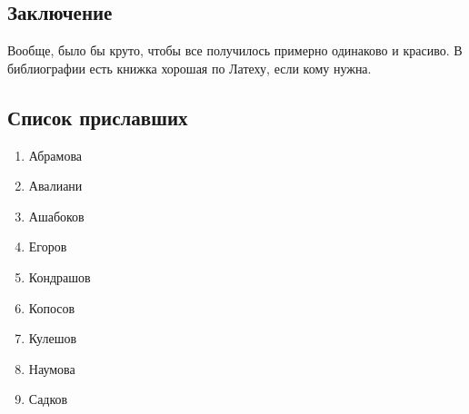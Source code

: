 \subsection{Заключение}

Вообще, было бы круто, чтобы все получилось примерно одинаково и красиво. В библиографии есть книжка хорошая по Латеху, если кому нужна.

\subsection{Список приславших}

\begin{enumerate}
    \item Абрамова
    \item Авалиани
    \item Ашабоков
    \item Егоров
    \item Кондрашов
    \item Копосов
    \item Кулешов
    \item Наумова
    \item Садков
\end{enumerate}